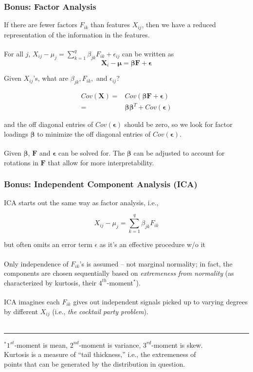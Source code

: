 \documentclass[xcolor={dvipsnames}]{beamer}
\begin{document}
\frame
{
 \frametitle{Bonus: Factor Analysis}

If there are fewer factors $F_{ik}$ than features $X_{ij}$, then we have a reduced
representation of the information in the features. \\${}$\\

For all $j$,  $X_{ij} - \mu_j =  \sum_{k=1}^q\beta_{jk} F_{ik} + \epsilon_{ij}$ 
can be written as
$$\pmb{X}_{i} - \pmb{\mu} = \pmb{\beta} \pmb{F}+ \pmb{\epsilon}$$

Given $X_{ij}$'s, what are $\beta_{jk}, F_{ik},$ and $\epsilon_{ij}$?

\begin{align*} %
      Cov(\pmb{X}) = {}& Cov(\pmb{\beta} \pmb{F} + \pmb{\epsilon}) \\
       = {}&  \pmb{\beta}\pmb{\beta}^T + Cov(\pmb{\epsilon})
\end{align*}	

and the off diagonal entries of $Cov(\pmb{\epsilon})$ should be zero, so we look
for factor loadings $\pmb{\beta}$ to minimize the off diagonal entries of $Cov(\pmb{\epsilon})$.\\${}$\\
      
Given $\pmb{\beta}$, $\pmb{F}$ and $\pmb{\epsilon}$ can be solved for.
The $\pmb{\beta}$ can be adjusted to account for rotations in $\pmb{F}$ that allow for more interpretability. 
      

}

\frame
{
\frametitle{Bonus: Independent Component Analysis (ICA)}

ICA starts out the same way as factor analysis, i.e., 

$$X_{ij} - \mu_j =  \sum_{k=1}^q\beta_{jk} F_{ik}$$ 

but often omits an error term $\epsilon$ as it's an effective procedure w/o it\\${}$\\%

Only independence of $F_{ik}$'s is assumed -- not marginal normality;
in fact, the components are chosen sequentially based on  
\emph{extremeness from normality} (as characterized by kurtosis, their $4^{th}$-moment$^*$). \\${}$\\
ICA imagines each $F_{ik}$ gives out independent signals picked up
to varying degrees by different $X_{ij}$ (i.e., \emph{the cocktail party problem}).\\${}$\\

\noindent\rule{1\textwidth}{0.4pt}
\footnotesize{
$^*$$1^{st}$-moment is mean, $2^{nd}$-moment is variance, $3^{rd}$-moment is skew.\\ 
Kurtosis is a measure of ``tail thickness,'' i.e., the extremeness of \\
points that can be generated by the distribution in question.}
}
\end{document}
